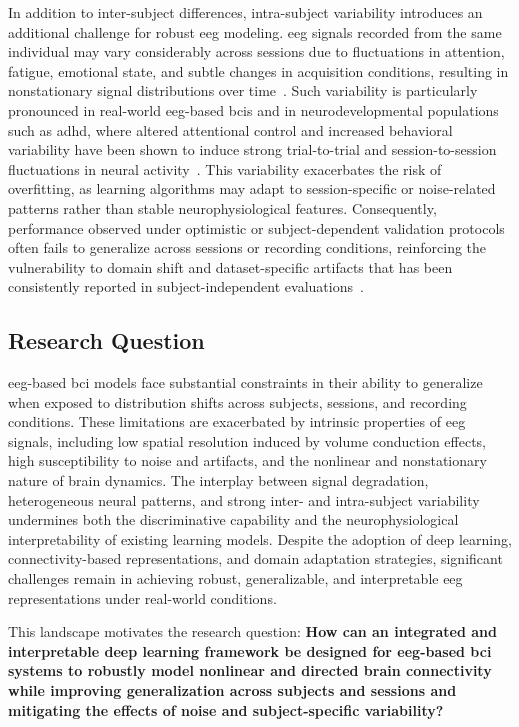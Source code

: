 In addition to inter-subject differences, intra-subject variability introduces an additional challenge for robust \gls{eeg} modeling. \gls{eeg} signals recorded from the same individual may vary considerably across sessions due to fluctuations in attention, fatigue, emotional state, and subtle changes in acquisition conditions, resulting in nonstationary signal distributions over time~\cite{al2025emotion}. Such variability is particularly pronounced in real-world \gls{eeg}-based \glspl{bci} and in neurodevelopmental populations such as \gls{adhd}, where altered attentional control and increased behavioral variability have been shown to induce strong trial-to-trial and session-to-session fluctuations in neural activity~\cite{lenartowicz2018adhd}. This variability exacerbates the risk of overfitting, as learning algorithms may adapt to session-specific or noise-related patterns rather than stable neurophysiological features. Consequently, performance observed under optimistic or subject-dependent validation protocols often fails to generalize across sessions or recording conditions, reinforcing the vulnerability to domain shift and dataset-specific artifacts that has been consistently reported in subject-independent evaluations~\cite{wang2024dmmr}.

\subsection{Research Question}

\gls{eeg}-based \gls{bci} models face substantial constraints in their ability to generalize when exposed to distribution shifts across subjects, sessions, and recording conditions. These limitations are exacerbated by intrinsic properties of \gls{eeg} signals, including low spatial resolution induced by volume conduction effects, high susceptibility to noise and artifacts, and the nonlinear and nonstationary nature of brain dynamics. The interplay between signal degradation, heterogeneous neural patterns, and strong inter- and intra-subject variability undermines both the discriminative capability and the neurophysiological interpretability of existing learning models. Despite the adoption of deep learning, connectivity-based representations, and domain adaptation strategies, significant challenges remain in achieving robust, generalizable, and interpretable \gls{eeg} representations under real-world conditions.

This landscape motivates the research question: \textbf{How can an integrated and interpretable deep learning framework be designed for \gls{eeg}-based \gls{bci} systems to robustly model nonlinear and directed brain connectivity while improving generalization across subjects and sessions and mitigating the effects of noise and subject-specific variability?}